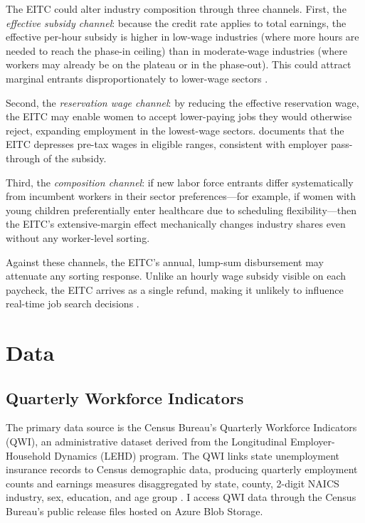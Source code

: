 \documentclass[12pt]{article}
\begin{document}
The EITC could alter industry composition through three channels. First, the \textit{effective subsidy channel}: because the credit rate applies to total earnings, the effective per-hour subsidy is higher in low-wage industries (where more hours are needed to reach the phase-in ceiling) than in moderate-wage industries (where workers may already be on the plateau or in the phase-out). This could attract marginal entrants disproportionately to lower-wage sectors \citep{rothstein2010}.

Second, the \textit{reservation wage channel}: by reducing the effective reservation wage, the EITC may enable women to accept lower-paying jobs they would otherwise reject, expanding employment in the lowest-wage sectors. \citet{leigh2010} documents that the EITC depresses pre-tax wages in eligible ranges, consistent with employer pass-through of the subsidy.

Third, the \textit{composition channel}: if new labor force entrants differ systematically from incumbent workers in their sector preferences---for example, if women with young children preferentially enter healthcare due to scheduling flexibility---then the EITC's extensive-margin effect mechanically changes industry shares even without any worker-level sorting.

Against these channels, the EITC's annual, lump-sum disbursement may attenuate any sorting response. Unlike an hourly wage subsidy visible on each paycheck, the EITC arrives as a single refund, making it unlikely to influence real-time job search decisions \citep{romich2006, sykes2015, halpern2015}.


\section{Data}

\subsection{Quarterly Workforce Indicators}

The primary data source is the Census Bureau's Quarterly Workforce Indicators (QWI), an administrative dataset derived from the Longitudinal Employer-Household Dynamics (LEHD) program. The QWI links state unemployment insurance records to Census demographic data, producing quarterly employment counts and earnings measures disaggregated by state, county, 2-digit NAICS industry, sex, education, and age group \citep{abowd2009}. I access QWI data through the Census Bureau's public release files hosted on Azure Blob Storage.
\end{document}

